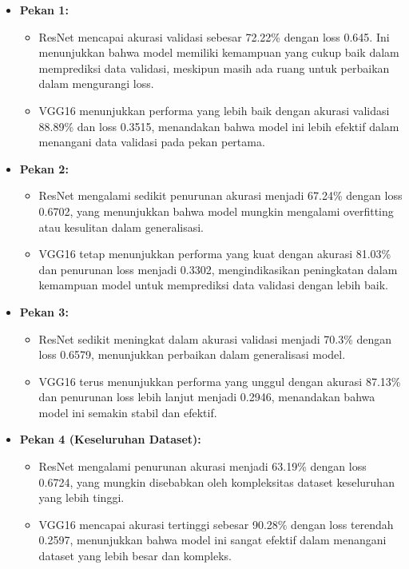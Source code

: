 \documentclass[12pt,a4paper]{article}
\begin{document}
\begin{itemize}
    \item \textbf{Pekan 1:} 
    \begin{itemize}
        \item ResNet mencapai akurasi validasi sebesar 72.22\% dengan loss 0.645. Ini menunjukkan bahwa model memiliki kemampuan yang cukup baik dalam memprediksi data validasi, meskipun masih ada ruang untuk perbaikan dalam mengurangi loss.
        \item VGG16 menunjukkan performa yang lebih baik dengan akurasi validasi 88.89\% dan loss 0.3515, menandakan bahwa model ini lebih efektif dalam menangani data validasi pada pekan pertama.
    \end{itemize}

    \item \textbf{Pekan 2:}
    \begin{itemize}
        \item ResNet mengalami sedikit penurunan akurasi menjadi 67.24\% dengan loss 0.6702, yang menunjukkan bahwa model mungkin mengalami overfitting atau kesulitan dalam generalisasi.
        \item VGG16 tetap menunjukkan performa yang kuat dengan akurasi 81.03\% dan penurunan loss menjadi 0.3302, mengindikasikan peningkatan dalam kemampuan model untuk memprediksi data validasi dengan lebih baik.
    \end{itemize}

    \item \textbf{Pekan 3:}
    \begin{itemize}
        \item ResNet sedikit meningkat dalam akurasi validasi menjadi 70.3\% dengan loss 0.6579, menunjukkan perbaikan dalam generalisasi model.
        \item VGG16 terus menunjukkan performa yang unggul dengan akurasi 87.13\% dan penurunan loss lebih lanjut menjadi 0.2946, menandakan bahwa model ini semakin stabil dan efektif.
    \end{itemize}

    \item \textbf{Pekan 4 (Keseluruhan Dataset):}
    \begin{itemize}
        \item ResNet mengalami penurunan akurasi menjadi 63.19\% dengan loss 0.6724, yang mungkin disebabkan oleh kompleksitas dataset keseluruhan yang lebih tinggi.
        \item VGG16 mencapai akurasi tertinggi sebesar 90.28\% dengan loss terendah 0.2597, menunjukkan bahwa model ini sangat efektif dalam menangani dataset yang lebih besar dan kompleks.
    \end{itemize}
\end{itemize}
\end{document}
